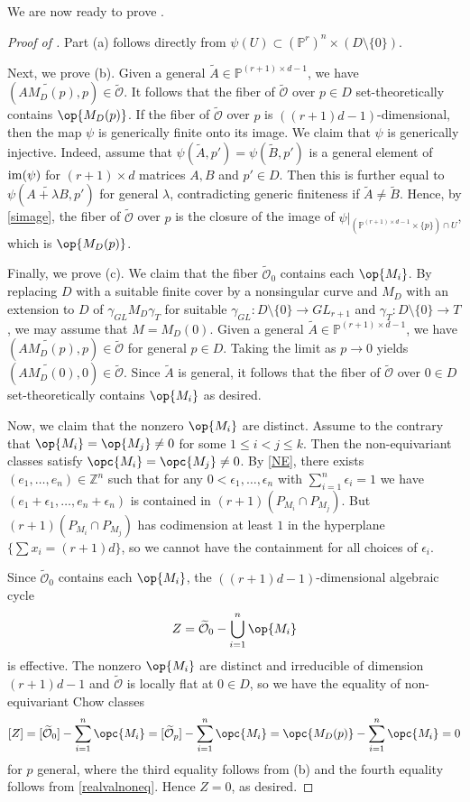 \documentclass[12pt]{amsart}
\newcommand{\mb}{\mathbb}
\newcommand{\mc}{\mathcal}
\newcommand{\im}{{\rm im}}
\newcommand{\wt}{\widetilde}
\theoremstyle{plain}
\theoremstyle{definition}
\theoremstyle{remark}
\begin{document}
We are now ready to prove .
\begin{proof}[Proof of ]
Part (a) follows directly from $\psi(U) \subset (\mb{P}^r)^n \times (D \setminus \{0\})$.

Next, we prove (b). Given a general $\wt A \in \mb{P}^{(r+1)\times d-1}$, we have $(\wt{AM_D(p)}, p) \in \wt{\mc{O}}$. It follows that the fiber of $\wt{\mc{O}}$ over $p \in D$ set-theoretically contains $\op{M_D(p)}$.
If the fiber of $\wt{\mc{O}}$ over $p$ is $((r+1)d-1)$-dimensional, then the map $\psi$ is generically finite onto its image. We claim that $\psi$ is generically injective. Indeed, assume that $\psi(\wt{A}, p') = \psi(\wt{B}, p')$ is a general element of $\im(\psi)$ for $(r+1) \times d$ matrices $A, B$ and $p' \in D$. Then this is further equal to $\psi(\wt{A+ \lambda B},p')$ for general $\lambda$, contradicting generic finiteness if $\wt{A} \neq \wt{B}$.
Hence, by \cref{simage}, the fiber of $\wt{\mc{O}}$ over $p$ is the closure of the image of $\psi|_{(\mb{P}^{(r+1)\times d-1} \times \{p\}) \cap U}$, which is $\op{M_D(p)}$.

Finally, we prove (c). We claim that the fiber $\wt{\mc{O}}_0$ contains each $\op{M_i}$. By replacing $D$ with a suitable finite cover by a nonsingular curve and $M_D$ with an extension to $D$ of $\gamma_{GL} M_D \gamma_T$ for suitable $\gamma_{GL} : D \setminus \{0\} \to GL_{r+1}$ and $\gamma_T : D \setminus \{0\} \to T$, we may assume that $M = M_D(0)$. Given a general $\tilde A \in \mb{P}^{(r+1)\times d-1}$, we have $(\wt{AM_D(p)}, p) \in \wt{\mc{O}}$ for general $p \in D$. Taking the limit as $p \to 0$ yields $(\wt{AM_D(0)}, 0) \in \wt{\mc{O}}$. Since $\tilde A$ is general, it follows that the fiber of $\wt{\mc{O}}$ over $0 \in D$ set-theoretically contains $\op{M_i}$ as desired.

Now, we claim that the nonzero $\op{M_i}$ are distinct. Assume to the contrary that $\op{M_i} = \op{M_j} \neq 0$ for some $1 \leq i< j \leq k$. Then the non-equivariant classes satisfy $\opc{M_i} = \opc{M_j} \neq 0$. By \cref{NE}, there exists $(e_1,\ldots, e_n)\in \mb{Z}^n$ such that for any $0 < \epsilon_1, \ldots, \epsilon_n$ with $\sum_{i=1}^n \epsilon_i = 1$ we have $(e_1 + \epsilon_1, \ldots, e_n + \epsilon_n)$ is contained in $(r+1) (P_{M_i} \cap P_{M_j})$. But $(r+1) (P_{M_i} \cap P_{M_j})$ has codimension at least $1$ in the hyperplane $\{\sum x_i= (r+1)d\}$, so we cannot have the containment for all choices of $\epsilon_i$.

Since $\wt{\mc{O}}_0$ contains each $\op{M_i}$, the $((r+1)d-1)$-dimensional algebraic cycle \[Z = \wt{\mc{O}}_0 - \bigcup_{i=1}^n \op{M_i}\] is effective. The nonzero $\op{M_i}$ are distinct and irreducible of dimension $(r+1)d - 1$ and $\wt{\mc{O}}$ is locally flat at $0 \in D$, so we have the equality of non-equivariant Chow classes
\[
[Z] = [\wt{\mc{O}}_0] - \sum_{i=1}^n \opc{M_i} 
= [\wt{\mc{O}}_p] - \sum_{i=1}^n \opc{M_i} 
= \opc{M_D(p)} - \sum_{i=1}^n \opc{M_i} 
= 0
\]
for $p$ general, where the third equality follows from (b) and the fourth equality follows from \cref{realvalnoneq}. Hence $Z = 0$, as desired.
\end{proof}
\end{document}
